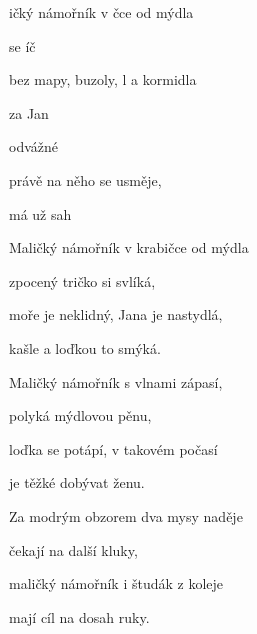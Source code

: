 

\zs
{}ičký námořník v čce od mýdla

 se íč 

bez mapy, buzoly, l a kormidla

 za  Jan
\ks

\zr
{} 
 

 odvážné 

 právě na něho  se usměje,

 má už sah 
\kr

\zs
Maličký námořník v krabičce od mýdla

zpocený tričko si svlíká,

moře je neklidný, Jana je nastydlá,

kašle a loďkou to smýká.
\ks

\zr \kr


\zs
Maličký námořník s vlnami zápasí,

polyká mýdlovou pěnu,

loďka se potápí, v takovém počasí

je těžké dobývat ženu.
\ks

\zr

Za modrým obzorem dva mysy naděje

čekají na další kluky,

maličký námořník i študák z koleje

mají cíl na dosah ruky.
\kr

\kp





